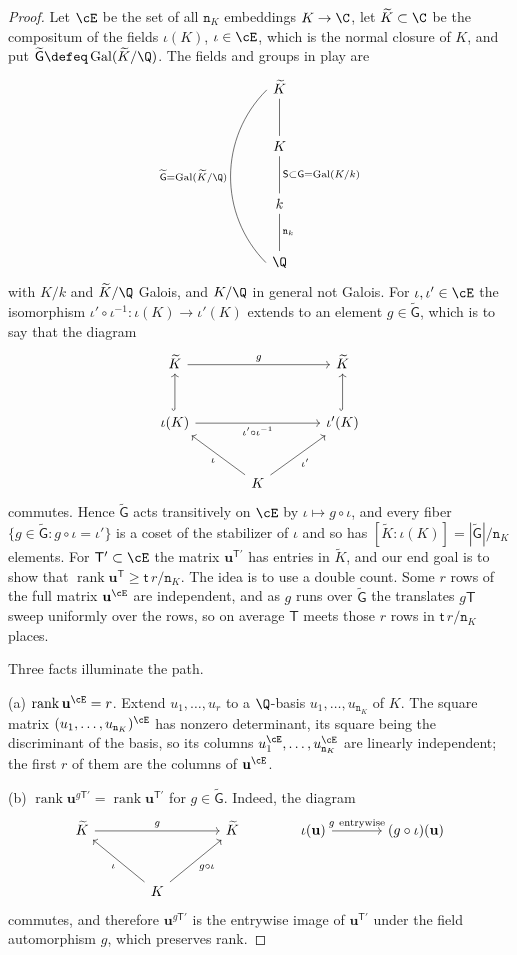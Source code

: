 \documentclass[11pt, reqno, twoside, letterpaper]{amsart}
\newcommand{\vu}{\mathbf{u}}
\DeclareMathOperator{\rk}{rank}
\DeclareMathOperator{\Gal}{Gal}
\newcommand{\dk}{{\mathtt{n}_k}}
\newcommand{\dK}{{\mathtt{n}_K}}
\newcommand{\galKk}{\mathsf{G}}
\newcommand{\galL}{\widetilde{\mathsf{G}}}
\newcommand{\Kf}{K}
\newcommand{\Sset}{\mathsf{S}}
\newcommand{\Tset}{\mathsf{T}}
\newcommand{\nT}{\mathsf{t}}
\begin{document}
\begin{proof}
Let $\cE$ be the set of all $\dK$ embeddings $\Kf\to\C$, let
$\widetilde{\Kf}\subset\C$ be the compositum of the fields
$\iota(\Kf)$, $\iota\in\cE$, which is the normal closure of $\Kf$, and
put $\galL\defeq\Gal(\widetilde{\Kf}/\Q)$. The fields and groups in
play are
\[
\begin{tikzcd}[row sep=large]
\widetilde{\Kf} \arrow[d, dash]
\arrow[ddd, dash, bend right=45, "\galL=\Gal(\widetilde{\Kf}/\Q)"',
start anchor=west, end anchor=west] \\
\Kf \arrow[d, dash, "\Sset\subset\galKk=\Gal(\Kf/k)"] \\
k \arrow[d, dash, "\dk"] \\
\Q
\end{tikzcd}
\]
with $\Kf/k$ and $\widetilde{\Kf}/\Q$ Galois, and $\Kf/\Q$ in general
not Galois. For $\iota,\iota'\in\cE$ the isomorphism
$\iota'\circ\iota^{-1}\colon\iota(\Kf)\to\iota'(\Kf)$ extends to an
element $g\in\galL$, which is to say that the diagram
\[
\begin{tikzcd}[column sep=large, row sep=large]
\widetilde{\Kf} \arrow[rr, "g"]
& & \widetilde{\Kf} \\
\iota(\Kf) \arrow[u, hook] \arrow[rr, "\iota'\circ\iota^{-1}"']
& & \iota'(\Kf) \arrow[u, hook] \\
& \Kf \arrow[lu, "\iota"] \arrow[ru, "\iota'"'] &
\end{tikzcd}
\]
commutes. Hence $\galL$ acts transitively on $\cE$ by
$\iota\mapsto g\circ\iota$, and every fiber
$\{g\in\galL:g\circ\iota=\iota'\}$ is a coset of the stabilizer of
$\iota$ and so has $[\widetilde{\Kf}:\iota(\Kf)]=|\galL|/\dK$
elements. For $\Tset'\subset\cE$ the matrix $\vu^{\Tset'}$ has entries
in $\widetilde{\Kf}$, and our end goal is to show that
$\rk\vu^{\Tset}\ge\nT\,r/\dK$. The idea is to use a double count. Some
$r$ rows of the full matrix $\vu^{\cE}$ are independent, and as $g$
runs over $\galL$ the translates $g\Tset$ sweep uniformly over the
rows, so on average $\Tset$ meets those $r$ rows in $\nT\,r/\dK$
places.

Three facts illuminate the path.

(a) $\rk\vu^{\cE}=r$. Extend $u_1,\dots,u_r$ to a $\Q$-basis
$u_1,\dots,u_\dK$ of $\Kf$. The square matrix
$(u_1,\dots,u_\dK)^{\cE}$ has nonzero determinant, its square being
the discriminant of the basis, so its columns
$u_1^{\cE},\dots,u_\dK^{\cE}$ are linearly independent; the first $r$
of them are the columns of $\vu^{\cE}$.

(b) $\rk\vu^{g\Tset'}=\rk\vu^{\Tset'}$ for $g\in\galL$. Indeed, the
diagram
\[
\begin{tikzcd}[column sep=large, row sep=large]
\widetilde{\Kf} \arrow[rr, "g"] & & \widetilde{\Kf}
& \iota(\vu) \arrow[r, "g\ \text{entrywise}"] & (g\circ\iota)(\vu) \\
& \Kf \arrow[lu, "\iota"] \arrow[ru, "g\circ\iota"'] & & &
\end{tikzcd}
\]
commutes, and therefore $\vu^{g\Tset'}$ is the entrywise image of
$\vu^{\Tset'}$ under the field automorphism $g$, which preserves rank.


\end{proof}
\end{document}
